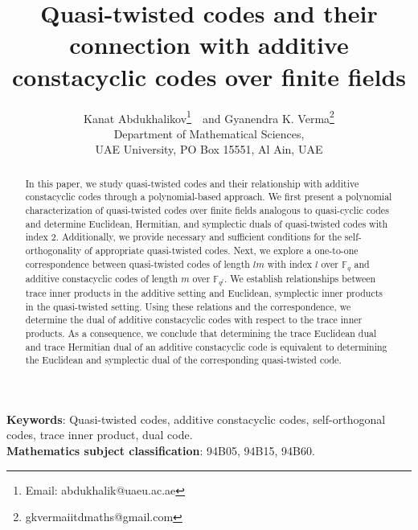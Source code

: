 \documentclass[12 pt]{extarticle}
\title{Quasi-twisted codes and their connection with additive constacyclic codes over finite fields}
\author{Kanat Abdukhalikov\footnote{Email: abdukhalik@uaeu.ac.ae}\ \  and Gyanendra K. Verma\footnote{ gkvermaiitdmaths@gmail.com} \\
Department of Mathematical Sciences,\\
UAE University, PO Box 15551, Al Ain, UAE}
\date{}
\numberwithin{equation}{section}
\theoremstyle{definition}
\begin{document}
	\maketitle
\begin{abstract} 
In this paper, we study quasi-twisted codes and their relationship with additive constacyclic codes through a polynomial-based approach. We first present a polynomial characterization of quasi-twisted codes over finite fields analogous to quasi-cyclic codes and determine  Euclidean, Hermitian, and symplectic duals of quasi-twisted codes with index $2$. Additionally, we provide necessary and sufficient conditions for the self-orthogonality of appropriate quasi-twisted codes. Next, we explore a one-to-one correspondence between quasi-twisted codes of length $lm$ with index $l$ over $\mathbb{F}_q$  and additive constacyclic codes of length $m$ over $\mathbb{F}_{q^l}$. We establish relationships between trace inner products in the additive setting and Euclidean, symplectic inner products in the quasi-twisted setting.  Using these relations and the correspondence, we determine the dual of additive constacyclic codes with respect to the trace inner products. As a consequence, we conclude that determining the trace Euclidean dual and trace Hermitian dual of an additive constacyclic code is equivalent to determining the Euclidean and symplectic dual of the corresponding quasi-twisted code.
\end{abstract}
\textbf{Keywords}:  Quasi-twisted codes, additive constacyclic codes, self-orthogonal codes, trace inner product, dual code.\\
	\textbf{Mathematics subject classification}: 94B05, 94B15, 94B60.\\
\end{document}
